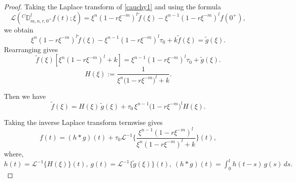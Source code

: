 \documentclass[a4paper,12pt]{article}
\theoremstyle{remark}
\begin{document}
    \begin{proof}
        	Taking the Laplace transform of \eqref{cauchy1} and using the formula  
	\[
	\mathcal{L}({}^{C}\mathbb{D}^{l}_{m,n,r,0^+} f(t) ;\xi)
	= \xi^{n}(1 - r \xi^{-m})^{l}\tilde{f}(\xi) - \xi^{n-1}(1 - r \xi^{-m})^{l}f(0^+),
	\]
	we obtain
	\[
	\xi^{n}(1 - r \xi^{-m})^{l}\tilde{f}(\xi) - \xi^{n-1}(1 - r \xi^{-m})^{l}\tau_0 + k \tilde{f}(\xi) = \tilde{g}(\xi).
	\]
 Rearranging gives
	\[
	\tilde{f}(\xi)[\xi^{n}(1 - r \xi^{-m})^{l} + k]
	= \xi^{n-1}(1 - r \xi^{-m})^{l}\tau_0 + \tilde{g}(\xi).
	\]
    \[
H(\xi) := \frac{1}{\xi^{n}\big(1 - r\xi^{-m}\big)^{l} + k}.
\]

Then we have
\[
\widetilde{f}(\xi)
= H(\xi)\,\widetilde{g}(\xi)
+ \tau_{0}\,\xi^{n-1}\big(1 - r\xi^{-m}\big)^{l}H(\xi).
\]

Taking the inverse Laplace transform termwise gives
\[
f(t)= (h *g)(t)+\tau_{0}\mathcal{L}^{-1}\Big\{\frac{\xi^{n-1}(1 - r \xi^{-m})^{l}}{\xi^{n}(1 - r \xi^{-m})^{l} + k}\Big\}(t),
\]
where, $h(t) = \mathcal{L}^{-1}\{H(\xi)\}(t),
~
g(t) = \mathcal{L}^{-1}\{\widetilde{g}(\xi)\}(t),~
(h * g)(t) = \int_{0}^{t} h(t - s)\,g(s)\,ds.
$

    
    
    
    
    
    
    
    
    
    
    
    
    
    
    
    

\end{proof}
\end{document}
